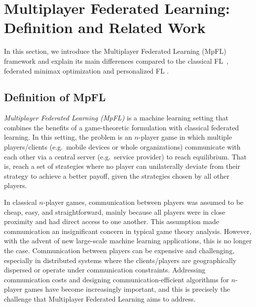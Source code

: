 \documentclass{article}
\theoremstyle{plain}
\theoremstyle{remark}
\begin{document}
\section{Multiplayer Federated Learning: Definition and Related Work}
\label{section:MpFL-concept}

In this section, we introduce the Multiplayer Federated Learning (MpFL) framework and explain its main differences compared to the classical FL~\citep{kairouz2021advances}, federated minimax optimization \citep{deng2021local, sharma2022federated, zhang2023communication} and personalized FL \citep{FallahMokhtariOzdaglar2020_personalized, T.DinhTranNguyen2020_personalized}. 

\subsection{Definition of MpFL}

\emph{Multiplayer Federated Learning (MpFL)} is a machine learning setting that combines the benefits of a game-theoretic formulation with classical federated learning. In this setting, the problem is an $n$-player game in which multiple players/clients (e.g.\ mobile devices or whole organizations) communicate with each other via a central server (e.g.\ service provider) to reach equilibrium. 
That is, reach a set of strategies where no player can unilaterally deviate from their strategy to achieve a better payoff, given the strategies chosen by all other players. 

In classical $n$-player games, communication between players was assumed to be cheap, easy, and straightforward, mainly because all players were in close proximity and had direct access to one another. This assumption made communication an insignificant concern in typical game theory analysis. However, with the advent of new large-scale machine learning applications, this is no longer the case. 
Communication between players can be expensive and challenging, especially in distributed systems where the clients/players are geographically dispersed or operate under communication constraints. Addressing communication costs and designing communication-efficient algorithms for $n$-player games have become increasingly important, and this is precisely the challenge that Multiplayer Federated Learning aims to address.
\end{document}
